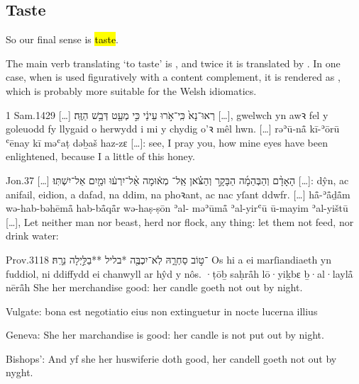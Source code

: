 \subsection{Taste}

\begin{paper}
	So our final sense is \hl{taste}.
\end{paper}


\begin{paper}
	The main verb translating  ‘to taste’ is , and twice it is translated by . In one case, when  is used figuratively with a content complement, it is rendered as , which is probably more suitable for the Welsh idiomatics.
\end{paper}

\begin{example}{1 Sam.}{14}{29}{}{}
	\quoling
	{[…] רְאוּ־נָא֙ כִּֽי־אֹ֣רוּ עֵינַ֔י כִּ֣י  מְעַ֖ט דְּבַ֥שׁ הַזֶּֽה׃}
	{[…], gwelwch yn awꝛ fel y goleuodd fy llygaid o herwydd i mi  y chydig o’ꝛ mêl hwn.}
	{[…] rəʾū-nå̄ kī-ʾōrū ʿēnay kī  məʿaṭ dəḇaš haz-zɛ}
	{[…]: see, I pray you, how mine eyes have been enlightened, because I  a little of this honey.}
\end{example}

\begin{example}{Jon.}{3}{7}{}{}
	\quoling
	{[…] הָאָדָ֨ם וְהַבְּהֵמָ֜ה הַבָּקָ֣ר וְהַצֹּ֗אן אַֽל־ מְא֔וּמָה אַ֨ל־יִרְע֔וּ וּמַ֖יִם אַל־יִשְׁתּֽוּ׃}
	{[…]: dŷn, ac anifail, eidion, a dafad, na  ddim, na phoꝛant, ac nac yſant ddwfr.}
	{[…] hå̄-ʾå̄ḏå̄m wə-hab-bəhēmå̄ hab-bå̄qå̄r wə-haṣ-ṣōn ʾal- məʾūmå̄ ʾal-yirʿū ū-mayim ʾal-yištū}
	{[…], Let neither man nor beast, herd nor flock,  any thing: let them not feed, nor drink water:}
\end{example}

\begin{example}{Prov.}{31}{18}{}{}
	\quoling
	{ ־ט֣וֹב סַחְרָ֑הּ לֹֽא־יִכְבֶּ֖ה *בליל **בַלַּ֣יְלָה נֵרָֽהּ׃}
	{Os hi a   ei marſiandiaeth yn fuddiol, ni ddiffydd ei chanwyll ar hŷd y nôs.}
	{ ·ṭōḇ saḥrå̄h lō·yiḵbɛ ḇ·al·laylå̄ nērå̄h}
	{She   her merchandise  good: her candle goeth not out by night.}
\end{example}
\begin{compactdesc}\small
	\item [Vulgate:]   bona est negotiatio eius non extinguetur in nocte lucerna illius
	\item [Geneva:] She   her marchandise is good: her candle is not put out by night.
	\item [Bishops’:] And yf she   her huswiferie doth good, her candell goeth not out by nyght.
\end{compactdesc}



